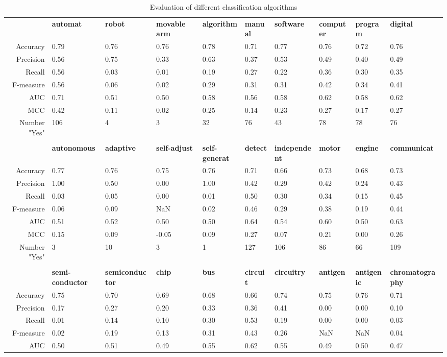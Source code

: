 \begin{table}
\begin{footnotesize}
\begin{threeparttable}
\caption{{\normalsize Evaluation of different classification algorithms}}
\label{table:table_compare_classalg}
\begin{tabular}{rlllllllll}
\toprule 
 & \textbf{automat} & \textbf{robot} & \textbf{movable arm} & \textbf{algorithm} & \textbf{manual} & \textbf{software} & \textbf{computer} & \textbf{program} & \textbf{digital}  \tabularnewline 
Accuracy & 0.79 & 0.76 & 0.76 & 0.78 & 0.71 & 0.77 & 0.76 & 0.72 & 0.76  \tabularnewline 
Precision & 0.56 & 0.75 & 0.33 & 0.63 & 0.37 & 0.53 & 0.49 & 0.40 & 0.49  \tabularnewline 
Recall & 0.56 & 0.03 & 0.01 & 0.19 & 0.27 & 0.22 & 0.36 & 0.30 & 0.35  \tabularnewline 
F-measure & 0.56 & 0.06 & 0.02 & 0.29 & 0.31 & 0.31 & 0.42 & 0.34 & 0.41  \tabularnewline 
AUC & 0.71 & 0.51 & 0.50 & 0.58 & 0.56 & 0.58 & 0.62 & 0.58 & 0.62  \tabularnewline 
MCC & 0.42 & 0.11 & 0.02 & 0.25 & 0.14 & 0.23 & 0.27 & 0.17 & 0.27  \tabularnewline 
Number "Yes" & 106 & 4 & 3 & 32 & 76 & 43 & 78 & 78 & 76  \tabularnewline 
\tabularnewline 
 & \textbf{autonomous} & \textbf{adaptive} & \textbf{self-adjust} & \textbf{self-generat} & \textbf{detect} & \textbf{independent} & \textbf{motor} & \textbf{engine} & \textbf{communicat}  \tabularnewline 
Accuracy & 0.77 & 0.76 & 0.75 & 0.76 & 0.71 & 0.66 & 0.73 & 0.68 & 0.73  \tabularnewline 
Precision & 1.00 & 0.50 & 0.00 & 1.00 & 0.42 & 0.29 & 0.42 & 0.24 & 0.43  \tabularnewline 
Recall & 0.03 & 0.05 & 0.00 & 0.01 & 0.50 & 0.30 & 0.34 & 0.15 & 0.45  \tabularnewline 
F-measure & 0.06 & 0.09 & NaN & 0.02 & 0.46 & 0.29 & 0.38 & 0.19 & 0.44  \tabularnewline 
AUC & 0.51 & 0.52 & 0.50 & 0.50 & 0.64 & 0.54 & 0.60 & 0.50 & 0.63  \tabularnewline 
MCC & 0.15 & 0.09 & -0.05 & 0.09 & 0.27 & 0.07 & 0.21 & 0.00 & 0.26  \tabularnewline 
Number "Yes" & 3 & 10 & 3 & 1 & 127 & 106 & 86 & 66 & 109  \tabularnewline 
\tabularnewline 
 & \textbf{semi-conductor} & \textbf{semiconductor} & \textbf{chip} & \textbf{bus} & \textbf{circuit} & \textbf{circuitry} & \textbf{antigen} & \textbf{antigenic} & \textbf{chromatography}  \tabularnewline 
Accuracy & 0.75 & 0.70 & 0.69 & 0.68 & 0.66 & 0.74 & 0.75 & 0.76 & 0.71  \tabularnewline 
Precision & 0.17 & 0.27 & 0.20 & 0.33 & 0.36 & 0.41 & 0.00 & 0.00 & 0.10  \tabularnewline 
Recall & 0.01 & 0.14 & 0.10 & 0.30 & 0.53 & 0.19 & 0.00 & 0.00 & 0.03  \tabularnewline 
F-measure & 0.02 & 0.19 & 0.13 & 0.31 & 0.43 & 0.26 & NaN & NaN & 0.04  \tabularnewline 
AUC & 0.50 & 0.51 & 0.49 & 0.55 & 0.62 & 0.55 & 0.49 & 0.50 & 0.47  \tabularnewline 

\end{tabular}
\end{threeparttable}
\end{footnotesize}
\end{table}
